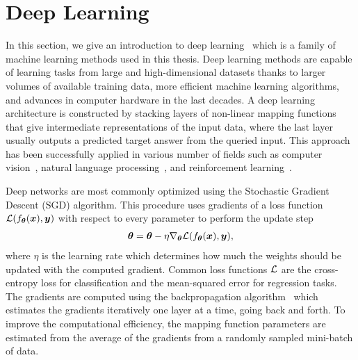 \section{Deep Learning}\label{sec:deep_learning}

In this section, we give an introduction to deep learning~\cite{goodfellow2016deep} which is a family of machine learning methods used in this thesis. Deep learning methods are capable of learning tasks from large and high-dimensional datasets thanks to larger volumes of available training data, more efficient machine learning algorithms, and advances in computer hardware in the last decades. A deep learning architecture is constructed by stacking layers of non-linear mapping functions that give intermediate representations of the input data, where the last layer usually outputs a predicted target answer from the queried input. This approach has been successfully applied in various number of fields such as computer vision~\cite{he2016deep, krizhevsky2012imagenet}, natural language processing~\cite{devlin2018bert}, and reinforcement learning~\cite{mnih2015human, silver2016mastering}. 


Deep networks are most commonly optimized using the Stochastic Gradient Descent (SGD) algorithm. This procedure uses gradients of a loss function ${\mathcal{L}}(f_{{\bm{\theta}}}({\bm{x}}), {\bm{y}})$ with respect to every parameter to perform the update step
\begin{align}\label{eq:weight_update_sgd}
	{\bm{\theta}} = {\bm{\theta}} - \eta \nabla_{{\bm{\theta}}} {\mathcal{L}}(f_{{\bm{\theta}}}({\bm{x}}), {\bm{y}}),
\end{align} 
where $\eta$ is the learning rate which determines how much the weights should be updated with the computed gradient. Common loss functions ${\mathcal{L}}$ are the cross-entropy loss for classification and the mean-squared error for regression tasks. The gradients are computed using the backpropagation algorithm~\cite{rumelhart1986learning} which estimates the gradients iteratively one layer at a time, going back and forth. To improve the computational efficiency, the mapping function parameters are estimated from the average of the gradients from a randomly sampled mini-batch of data. %


